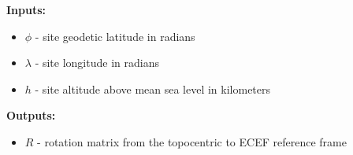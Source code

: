 \documentclass[11pt, reqno]{article}    %
\begin{document}
\noindent\textbf{Inputs:}
\begin{itemize}
    \item \( \phi \) - site geodetic latitude in radians
    \item \( \lambda \) - site longitude in radians
    \item \( h \) - site altitude above mean sea level in kilometers
\end{itemize}

\noindent \textbf{Outputs:}
\begin{itemize}
    \item \( R\) - rotation matrix from the topocentric to ECEF reference frame
\end{itemize}
\end{document}
